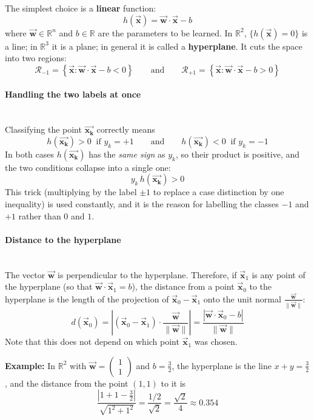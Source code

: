 \documentclass[]{article}
\newcommand{\R}{\mathbb{R}}
\newcommand{\vecx}{ \vec{\mathbf{x}} }
\newcommand{\vecxk}{ \vec{\mathbf{x_k}} }
\newcommand{\vecw}{ \vec{\mathbf{w}} }
\begin{document}
	The simplest choice is a \textbf{linear} function:
	$$
	h(\vecx) = \vecw \cdot \vecx - b
	$$
	where $\vecw \in \R^n$ and $b \in \R$ are the parameters to be learned.
	In $\R^2$, $\{h(\vecx) = 0\}$ is a line; in $\R^3$ it is a plane; in general it is called a \textbf{hyperplane}.
	It cuts the space into two regions:
	$$
	\mathcal{R}_{-1} = \left\{ \vecx : \vecw \cdot \vecx - b < 0 \right\}
	\qquad \text{and} \qquad
	\mathcal{R}_{+1} = \left\{ \vecx : \vecw \cdot \vecx - b > 0 \right\}
	$$

	\paragraph{Handling the two labels at once}
	\noindent\\
	Classifying the point $\vecxk$ correctly means
	$$
	h(\vecxk) > 0 \ \text{ if } y_k = +1
	\qquad \text{and} \qquad
	h(\vecxk) < 0 \ \text{ if } y_k = -1
	$$
	In both cases $h(\vecxk)$ has the \textit{same sign} as $y_k$, so their product is positive, and the two conditions collapse into a single one:
	$$
	y_k \, h(\vecxk) > 0
	$$
	This trick (multiplying by the label $\pm 1$ to replace a case distinction by one inequality) is used constantly, and it is the reason for labelling the classes $-1$ and $+1$ rather than $0$ and $1$.

	\paragraph{Distance to the hyperplane}
	\noindent\\
	The vector $\vecw$ is perpendicular to the hyperplane.
	Therefore, if $\vecx_1$ is any point of the hyperplane (so that $\vecw \cdot \vecx_1 = b$), the distance from a point $\vecx_0$ to the hyperplane is the length of the projection of $\vecx_0 - \vecx_1$ onto the unit normal $\frac{\vecw}{\|\vecw\|}$:
	$$
	d(\vecx_0) = \left| \left(\vecx_0 - \vecx_1\right) \cdot \frac{\vecw}{\|\vecw\|} \right|
	= \frac{\left| \vecw \cdot \vecx_0 - b \right|}{\|\vecw\|}
	$$
	Note that this does not depend on which point $\vecx_1$ was chosen.

	\noindent \textbf{Example:}
	In $\R^2$ with $\vecw = \begin{pmatrix} 1 \\ 1 \end{pmatrix}$ and $b = \frac{3}{2}$, the hyperplane is the line $x + y = \frac{3}{2}$, and the distance from the point $(1,1)$ to it is
	$$
	\frac{\left| 1 + 1 - \frac{3}{2} \right|}{\sqrt{1^2+1^2}} = \frac{1/2}{\sqrt{2}} = \frac{\sqrt{2}}{4} \approx 0.354
	$$
\end{document}

